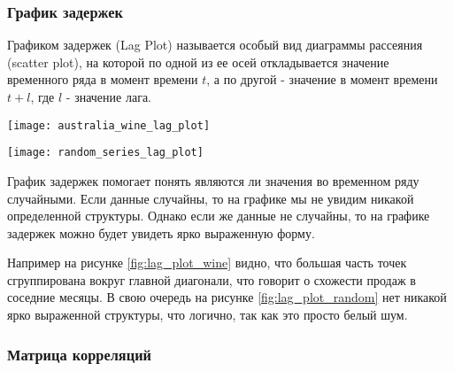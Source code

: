 \subsubsection{График задержек}
Графиком задержек (Lag Plot) называется особый вид диаграммы рассеяния (scatter plot), 
на которой по одной из ее осей откладывается значение временного ряда в момент времени 
$t$, а по другой - значение в момент времени $t + l$, где $l$ - значение лага.

\begin{center}
    \begin{minipage}{0.45\textwidth}
        \centering
        \texttt{[image: australia\_wine\_lag\_plot]}
        \label{fig:lag_plot_wine}
    \end{minipage}
    \hfill
    \begin{minipage}{0.45\textwidth}
        \centering
        \texttt{[image: random\_series\_lag\_plot]}
        \label{fig:lag_plot_random}
    \end{minipage}
\end{center}

График задержек помогает понять являются ли значения во временном ряду случайными. Если 
данные случайны, то на графике мы не увидим никакой определенной структуры. Однако 
если же данные не случайны, то на графике задержек можно будет увидеть ярко 
выраженную форму. 

Например на рисунке \ref{fig:lag_plot_wine} видно, что большая часть точек 
сгруппирована вокруг главной диагонали, что говорит о схожести продаж в соседние месяцы. 
В свою очередь на рисунке \ref{fig:lag_plot_random} нет никакой ярко выраженной 
структуры, что логично, так как это просто белый шум. \\

\subsubsection{Матрица корреляций}

